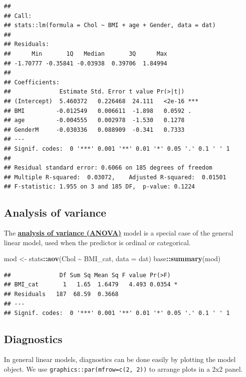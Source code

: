 \documentclass[
]{book}
\newenvironment{Shaded}{\begin{snugshade}}{\end{snugshade}}
\newcommand{\AttributeTok}[1]{\textcolor[rgb]{0.13,0.29,0.53}{#1}}
\newcommand{\FunctionTok}[1]{\textcolor[rgb]{0.13,0.29,0.53}{\textbf{#1}}}
\newcommand{\NormalTok}[1]{#1}
\newcommand{\OtherTok}[1]{\textcolor[rgb]{0.56,0.35,0.01}{#1}}
\newcommand{\SpecialCharTok}[1]{\textcolor[rgb]{0.81,0.36,0.00}{\textbf{#1}}}
\begin{document}
\begin{verbatim}
## 
## Call:
## stats::lm(formula = Chol ~ BMI + age + Gender, data = dat)
## 
## Residuals:
##      Min       1Q   Median       3Q      Max 
## -1.70777 -0.35841 -0.03938  0.39706  1.84994 
## 
## Coefficients:
##              Estimate Std. Error t value Pr(>|t|)    
## (Intercept)  5.460372   0.226468  24.111   <2e-16 ***
## BMI         -0.012549   0.006611  -1.898   0.0592 .  
## age         -0.004555   0.002978  -1.530   0.1278    
## GenderM     -0.030336   0.088909  -0.341   0.7333    
## ---
## Signif. codes:  0 '***' 0.001 '**' 0.01 '*' 0.05 '.' 0.1 ' ' 1
## 
## Residual standard error: 0.6066 on 185 degrees of freedom
## Multiple R-squared:  0.03072,    Adjusted R-squared:  0.01501 
## F-statistic: 1.955 on 3 and 185 DF,  p-value: 0.1224
\end{verbatim}

\subsection{Analysis of variance}\label{sec:anova}

The \textbf{\hyperref[acronyms_ANOVA]{analysis of variance (ANOVA)}} model is a special case of the general linear model, used when the predictor is ordinal or categorical.

\begin{Shaded}
\begin{Highlighting}[]
\NormalTok{mod }\OtherTok{\textless{}{-}}\NormalTok{ stats}\SpecialCharTok{::}\FunctionTok{aov}\NormalTok{(Chol }\SpecialCharTok{\textasciitilde{}}\NormalTok{ BMI\_cat, }\AttributeTok{data =}\NormalTok{ dat)}
\NormalTok{base}\SpecialCharTok{::}\FunctionTok{summary}\NormalTok{(mod)}
\end{Highlighting}
\end{Shaded}

\begin{verbatim}
##              Df Sum Sq Mean Sq F value Pr(>F)  
## BMI_cat       1   1.65  1.6479   4.493 0.0354 *
## Residuals   187  68.59  0.3668                 
## ---
## Signif. codes:  0 '***' 0.001 '**' 0.01 '*' 0.05 '.' 0.1 ' ' 1
\end{verbatim}

\subsection{Diagnostics}\label{diagnostics}

In general linear models, diagnostics can be done easily by plotting the model object. We use \texttt{graphics::par(mfrow=c(2,\ 2))} to arrange plots in a 2x2 panel.
\end{document}
